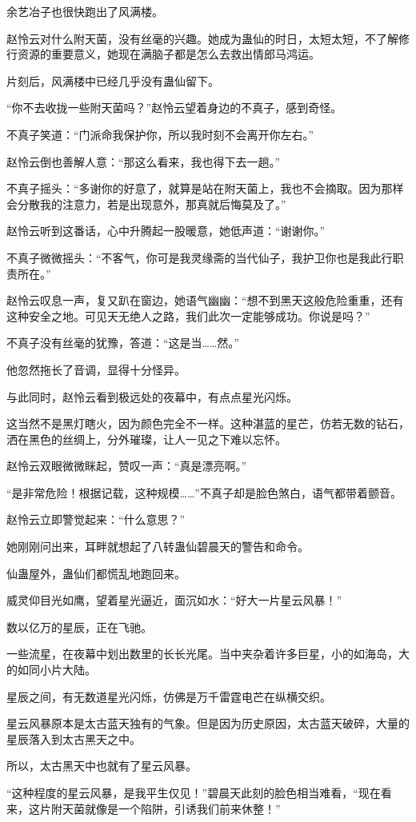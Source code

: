 \begin{this_body}
余艺冶子也很快跑出了风满楼。

赵怜云对什么附天菌，没有丝毫的兴趣。她成为蛊仙的时日，太短太短，不了解修行资源的重要意义，她现在满脑子都是怎么去救出情郎马鸿运。

片刻后，风满楼中已经几乎没有蛊仙留下。

“你不去收拢一些附天菌吗？”赵怜云望着身边的不真子，感到奇怪。

不真子笑道：“门派命我保护你，所以我时刻不会离开你左右。”

赵怜云倒也善解人意：“那这么看来，我也得下去一趟。”

不真子摇头：“多谢你的好意了，就算是站在附天菌上，我也不会摘取。因为那样会分散我的注意力，若是出现意外，那真就后悔莫及了。”

赵怜云听到这番话，心中升腾起一股暖意，她低声道：“谢谢你。”

不真子微微摇头：“不客气，你可是我灵缘斋的当代仙子，我护卫你也是我此行职责所在。”

赵怜云叹息一声，复又趴在窗边，她语气幽幽：“想不到黑天这般危险重重，还有这种安全之地。可见天无绝人之路，我们此次一定能够成功。你说是吗？”

不真子没有丝毫的犹豫，答道：“这是当……然。”

他忽然拖长了音调，显得十分怪异。

与此同时，赵怜云看到极远处的夜幕中，有点点星光闪烁。

这当然不是黑灯瞎火，因为颜色完全不一样。这种湛蓝的星芒，仿若无数的钻石，洒在黑色的丝绸上，分外璀璨，让人一见之下难以忘怀。

赵怜云双眼微微眯起，赞叹一声：“真是漂亮啊。”

“是非常危险！根据记载，这种规模……”不真子却是脸色煞白，语气都带着颤音。

赵怜云立即警觉起来：“什么意思？”

她刚刚问出来，耳畔就想起了八转蛊仙碧晨天的警告和命令。

仙蛊屋外，蛊仙们都慌乱地跑回来。

威灵仰目光如鹰，望着星光逼近，面沉如水：“好大一片星云风暴！”

数以亿万的星辰，正在飞驰。

一些流星，在夜幕中划出数里的长长光尾。当中夹杂着许多巨星，小的如海岛，大的如同小片大陆。

星辰之间，有无数道星光闪烁，仿佛是万千雷霆电芒在纵横交织。

星云风暴原本是太古蓝天独有的气象。但是因为历史原因，太古蓝天破碎，大量的星辰落入到太古黑天之中。

所以，太古黑天中也就有了星云风暴。

“这种程度的星云风暴，是我平生仅见！”碧晨天此刻的脸色相当难看，“现在看来，这片附天菌就像是一个陷阱，引诱我们前来休整！”

\end{this_body}

